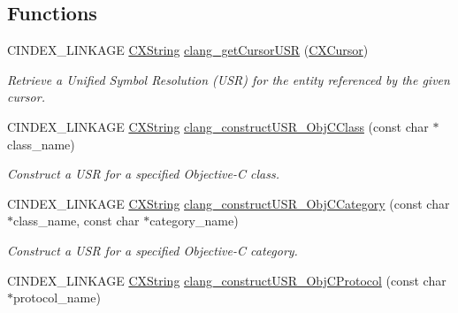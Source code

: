 \subsection*{Functions}
\begin{DoxyCompactItemize}
\item 
C\+I\+N\+D\+E\+X\+\_\+\+L\+I\+N\+K\+A\+GE \mbox{\hyperlink{structCXString}{C\+X\+String}} \mbox{\hyperlink{group__CINDEX__CURSOR__XREF_ga51679cb755bbd94cc5e9476c685f2df3}{clang\+\_\+get\+Cursor\+U\+SR}} (\mbox{\hyperlink{structCXCursor}{C\+X\+Cursor}})
\begin{DoxyCompactList}\small\item\em Retrieve a Unified Symbol Resolution (U\+SR) for the entity referenced by the given cursor. \end{DoxyCompactList}\item 
\mbox{\label{group__CINDEX__CURSOR__XREF_ga1ca1d94cdcb4d435c5e2e02d888b8e98}} 
C\+I\+N\+D\+E\+X\+\_\+\+L\+I\+N\+K\+A\+GE \mbox{\hyperlink{structCXString}{C\+X\+String}} \mbox{\hyperlink{group__CINDEX__CURSOR__XREF_ga1ca1d94cdcb4d435c5e2e02d888b8e98}{clang\+\_\+construct\+U\+S\+R\+\_\+\+Obj\+C\+Class}} (const char $\ast$class\+\_\+name)
\begin{DoxyCompactList}\small\item\em Construct a U\+SR for a specified Objective-\/C class. \end{DoxyCompactList}\item 
\mbox{\label{group__CINDEX__CURSOR__XREF_gabeb36e25f86fc061c0367145fab6e291}} 
C\+I\+N\+D\+E\+X\+\_\+\+L\+I\+N\+K\+A\+GE \mbox{\hyperlink{structCXString}{C\+X\+String}} \mbox{\hyperlink{group__CINDEX__CURSOR__XREF_gabeb36e25f86fc061c0367145fab6e291}{clang\+\_\+construct\+U\+S\+R\+\_\+\+Obj\+C\+Category}} (const char $\ast$class\+\_\+name, const char $\ast$category\+\_\+name)
\begin{DoxyCompactList}\small\item\em Construct a U\+SR for a specified Objective-\/C category. \end{DoxyCompactList}\item 
\mbox{\label{group__CINDEX__CURSOR__XREF_ga69236bf8ac3dadbb553ab6db463ad3d0}} 
C\+I\+N\+D\+E\+X\+\_\+\+L\+I\+N\+K\+A\+GE \mbox{\hyperlink{structCXString}{C\+X\+String}} \mbox{\hyperlink{group__CINDEX__CURSOR__XREF_ga69236bf8ac3dadbb553ab6db463ad3d0}{clang\+\_\+construct\+U\+S\+R\+\_\+\+Obj\+C\+Protocol}} (const char $\ast$protocol\+\_\+name)

\end{DoxyCompactItemize}
